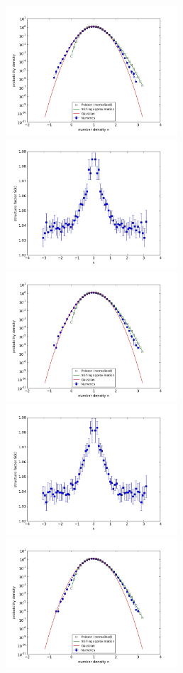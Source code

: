 \documentclass{article}
\begin{document}
\begin{figure}
\begin{center}
\end{center}
\includegraphics[width=0.5\linewidth,height=1.9in]{fig1/react_dt2_hist_mid1.jpg}
\includegraphics[width=0.5\linewidth,height=1.9in]{fig1/react_dt2_Sk_mid1.jpg}
\includegraphics[width=0.5\linewidth,height=1.9in]{fig1/react_dt2_hist_mid2.jpg}
\includegraphics[width=0.5\linewidth,height=1.9in]{fig1/react_dt2_Sk_mid2.jpg}
\includegraphics[width=0.5\linewidth,height=1.9in]{fig1/react_dt2_hist_mid3.jpg}

\end{figure}
\end{document}

